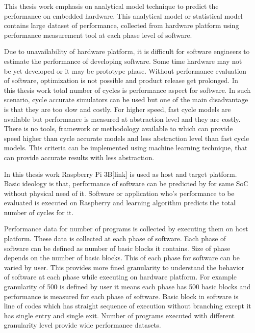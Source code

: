 \setlength{\parindent}{4em}
\setlength{\parskip}{1em}

This thesis work emphasis on analytical model technique to predict the performance on embedded hardware. This analytical model or statistical model contains large dataset of performance, collected from hardware platform using performance measurement tool at each phase level of software. 

\par Due to unavailability of hardware platform, it is difficult for software engineers to estimate the performance of developing software. Some time hardware may not be yet developed or it may be prototype phase. Without performance evaluation of software, optimization is not possible and product release get prolonged. In this thesis work total number of cycles is performance aspect for software. In such scenario, cycle accurate simulators can be used but one of the main disadvantage is that they are too slow and costly. For higher speed, fast cycle models are available but performance is measured at abstraction level and they are costly. There is no tools, framework or methodology available to which can provide speed higher than cycle accurate models and less abstraction level than fast cycle models. This criteria can be implemented using machine learning technique, that can provide accurate results with less abstraction. 

\par In this thesis work Raspberry Pi 3B[link] is used as host and target platform. Basic ideology is that, performance of software can be predicted by for same SoC without physical need of it. Software or application who's performance to be evaluated is executed on Raspberry and learning algorithm predicts the total number of cycles for it. 

\par Performance data for number of programs is collected by executing them on host platform. These data is collected at each phase of software. Each phase of software can be defined as number of basic blocks it contains. Size of phase depends on the number of basic blocks. This of each phase for software can be varied by user. This provides more fined granularity to understand the behavior of software at each phase while executing on hardware platform. For example granularity of 500 is defined by user it means each phase has 500 basic blocks and performance is measured for each phase of software. Basic block in software is line of codes which has straight sequence of execution without branching except it has single entry and single exit. Number of programs executed with different granularity level provide wide performance datasets. 

